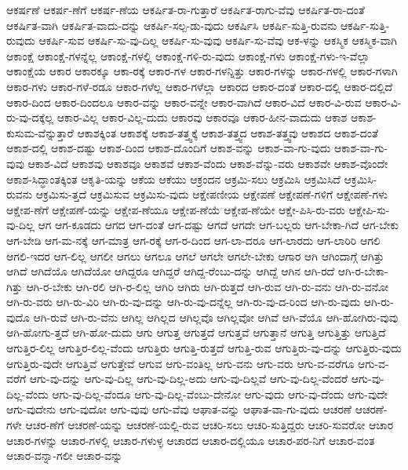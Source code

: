 {ಆಕರ್ಷಣೆ
ಆಕರ್ಷ-ಣೆಗೆ
ಆಕರ್ಷ-ಣೆಯ
ಆಕರ್ಷಿತ-ರಾ-ಗುತ್ತಾರೆ
ಆಕರ್ಷಿತ-ರಾಗು-ವೆವು
ಆಕರ್ಷಿತ-ರಾ-ದಂತೆ
ಆಕರ್ಷಿತ-ವಾಗಿ
ಆಕರ್ಷಿತ-ವಾದು-ದನ್ನು
ಆಕರ್ಷಿ-ಸಲ್ಪ-ಡು-ವುದು
ಆಕರ್ಷಿಸಿ
ಆಕರ್ಷಿ-ಸುತ್ತಿ-ರುವನು
ಆಕರ್ಷಿ-ಸುತ್ತಿ-ರುವುದು
ಆಕರ್ಷಿ-ಸುವ
ಆಕರ್ಷಿ-ಸು-ವು-ದಿಲ್ಲ
ಆಕರ್ಷಿ-ಸು-ವುವು
ಆಕರ್ಷಿ-ಸು-ವೆವು
ಆಕ-ಳನ್ನು
ಆಕಸ್ಮಿಕ
ಆಕಸ್ಮಿಕ-ವಾಗಿ
ಆಕಾಂಕ್ಷೆ
ಆಕಾಂಕ್ಷೆ-ಗಳನ್ನೆಲ್ಲ
ಆಕಾಂಕ್ಷೆ-ಗಳಲ್ಲಿ
ಆಕಾಂಕ್ಷೆ-ಗಳಿ-ರು-ವುದು
ಆಕಾಂಕ್ಷೆ-ಗಳು
ಆಕಾಂಕ್ಷೆ-ಗಳು-ಇ-ವೆಲ್ಲಾ
ಆಕಾಂಕ್ಷೆಯ
ಆಕಾರ
ಆಕಾರಕ್ಕೂ
ಆಕಾ-ರಕ್ಕೆ
ಆಕಾರ-ಗಳ
ಆಕಾರ-ಗಳನ್ನಿತ್ತು
ಆಕಾರ-ಗಳನ್ನು
ಆಕಾರ-ಗಳಲ್ಲಿ
ಆಕಾರ-ಗಳಾಗಿ
ಆಕಾರ-ಗಳು
ಆಕಾರ-ಗಳೆ-ರಡೂ
ಆಕಾರ-ಗಳೆಲ್ಲ
ಆಕಾರ-ಗಳೆಲ್ಲಾ
ಆಕಾರದ
ಆಕಾರ-ದಂತೆ
ಆಕಾರ-ದಲ್ಲಿ
ಆಕಾರ-ದಲ್ಲಿದೆ
ಆಕಾರ-ದಿಂದ
ಆಕಾರ-ದಿಂದಲೂ
ಆಕಾರ-ವನ್ನು
ಆಕಾರ-ವನ್ನೇ
ಆಕಾರ-ವಾಗಿದೆ
ಆಕಾರ-ವಿದೆ
ಆಕಾರ-ವಿ-ರುವ
ಆಕಾರ-ವಿ-ರು-ವು-ದಕ್ಕೆಲ್ಲ
ಆಕಾರ-ವಿಲ್ಲ
ಆಕಾರ-ವಿಲ್ಲ-ದುದು
ಆಕಾರವು
ಆಕಾರವೂ
ಆಕಾರ-ಹೀನ-ವಾದುದು
ಆಕಾಶ
ಆಕಾಶ-ಕುಸುಮ-ವೆನ್ನುತ್ತಾರೆ
ಆಕಾಶಕ್ಕಿಂತ
ಆಕಾಶಕ್ಕೆ
ಆಕಾಶ-ತತ್ತ್ವಕ್ಕೆ
ಆಕಾಶ-ತತ್ತ್ವದ
ಆಕಾಶ-ತತ್ತ್ವವು
ಆಕಾಶದ
ಆಕಾಶ-ದಂತೆ
ಆಕಾಶ-ದಲ್ಲಿ
ಆಕಾಶ-ದಷ್ಟು
ಆಕಾಶ-ದಿಂದ
ಆಕಾಶ-ದೊಂದಿಗೆ
ಆಕಾಶ-ವನ್ನು
ಆಕಾಶ-ವಾ-ಗು-ವುದು
ಆಕಾಶ-ವಾ-ಗು-ವುವು
ಆಕಾಶ-ವಿದೆ
ಆಕಾಶವು
ಆಕಾಶವೂ
ಆಕಾಶವೆ
ಆಕಾಶ-ವೆಂದು
ಆಕಾಶ-ವೆನ್ನು-ವರು
ಆಕಾಶವೇ
ಆಕಾಶ-ವೊಂದೇ
ಆಕಾಶ-ಸಿದ್ಧಾಂತಕ್ಕಿಂತ
ಆಕೃತಿ-ಯನ್ನು
ಆಕೆಯ
ಆಕೆಯು
ಆಕ್ರಂದನ
ಆಕ್ರಮಿ-ಸಲು
ಆಕ್ರಮಿಸಿ
ಆಕ್ರಮಿಸಿದೆ
ಆಕ್ರಮಿಸಿ-ರುವನು
ಆಕ್ರಮಿಸು-ತ್ತದೆ
ಆಕ್ರಮಿಸುವ
ಆಕ್ರಮಿಸು-ವುದು
ಆಕ್ಷೇಪಣೀಯ
ಆಕ್ಷೇಪಣೆ
ಆಕ್ಷೇಪಣೆ-ಗಳಿಗೆ
ಆಕ್ಷೇಪಣೆ-ಗಳು
ಆಕ್ಷೇಪ-ಣೆಗೆ
ಆಕ್ಷೇಪಣೆ-ಯನ್ನು
ಆಕ್ಷೇಪ-ಣೆಯೂ
ಆಕ್ಷೇಪ-ಣೆಯೆ
ಆಕ್ಷೇಪ-ಣೆಯೇ
ಆಕ್ಷೇ-ಪಿಸಿ-ರು-ವರು
ಆಕ್ಷೇಪಿ-ಸು-ವು-ದಿಲ್ಲ
ಆಗ
ಆಗ-ಕೂಡದು
ಆಗದ
ಆಗ-ದಂತೆ
ಆಗ-ದಷ್ಟು
ಆಗದೆ
ಆಗದೇ
ಆಗ-ಬಲ್ಲರು
ಆಗ-ಬೇಕಾ-ಗಿದೆ
ಆಗ-ಬೇಕು
ಆಗ-ಬೇಡಿ
ಆಗ-ಮ-ನಕ್ಕೆ
ಆಗ-ಮಾತ್ರ
ಆಗ-ರಕ್ಕೆ
ಆಗ-ರ-ದಿಂದ
ಆಗ-ಲಾ-ದರೂ
ಆಗ-ಲಾರದು
ಆಗ-ಲಾರಿರಿ
ಆಗಲಿ
ಆಗಲಿ-ಇದರ
ಆಗ-ಲಿಲ್ಲ
ಆಗಲೀ
ಆಗಲು
ಆಗಲೂ
ಆಗಲೆ
ಆಗಲೇ
ಆಗಲೇ-ಬೇಕು
ಆಗಾರ
ಆಗಿ
ಆಗಿಂದಾಗ್ಗೆ
ಆಗಿತ್ತು
ಆಗಿದೆ
ಆಗಿದೆಯೊ
ಆಗಿದೆಯೋ
ಆಗಿದ್ದರೂ
ಆಗಿದ್ದರೆ
ಆಗಿದ್ದ-ರೆಂಬು-ದನ್ನು
ಆಗಿದ್ದೆ
ಆಗಿನ
ಆಗಿ-ರದೆ
ಆಗಿ-ರ-ಬೇಕಾ-ಗಿತ್ತು
ಆಗಿ-ರ-ಬೇಕು
ಆಗಿ-ರಲಿ
ಆಗಿ-ರ-ಲಿಲ್ಲ
ಆಗಿರಿ
ಆಗಿರು
ಆಗಿ-ರುತ್ತದೆ
ಆಗಿ-ರುವ
ಆಗಿ-ರು-ವನು
ಆಗಿ-ರು-ವನೋ
ಆಗಿ-ರು-ವರು
ಆಗಿ-ರು-ವಿರಿ
ಆಗಿ-ರು-ವು-ದನ್ನು
ಆಗಿ-ರು-ವು-ದನ್ನೆಲ್ಲ
ಆಗಿ-ರು-ವು-ದ-ರಿಂದ
ಆಗಿ-ರು-ವುದು
ಆಗಿ-ರು-ವುದೊ
ಆಗಿ-ರುವೆ
ಆಗಿ-ರು-ವೆನು
ಆಗಿಲ್ಲ
ಆಗಿಲ್ಲದ
ಆಗಿಲ್ಲವೊ
ಆಗಿಲ್ಲವೋ
ಆಗಿವೆ
ಆಗಿ-ವೆಯೊ
ಆಗಿ-ಹೋಗಿರು-ವುವು
ಆಗಿ-ಹೋಗು-ತ್ತದೆ
ಆಗಿ-ಹೋ-ದುದು
ಆಗು
ಆಗುತ್ತ
ಆಗುತ್ತದೆ
ಆಗುತ್ತವೆ
ಆಗುತ್ತಾನೆ
ಆಗುತ್ತಿ
ಆಗುತ್ತಿತ್ತು
ಆಗುತ್ತಿದೆ
ಆಗುತ್ತಿರ-ಲಿಲ್ಲ
ಆಗುತ್ತಿರ-ಲಿಲ್ಲ-ವೆಂದು
ಆಗುತ್ತಿರು
ಆಗುತ್ತಿ-ರುತ್ತದೆ
ಆಗುತ್ತಿ-ರುವ
ಆಗುತ್ತಿರು-ವು-ದನ್ನು
ಆಗುತ್ತಿರು-ವುದು
ಆಗುತ್ತಿರು-ವುದೇ
ಆಗುತ್ತಿವೆ
ಆಗುತ್ತೇವೆ
ಆಗುವ
ಆಗು-ವಂತಿಲ್ಲ
ಆಗು-ವನು
ಆಗು-ವರು
ಆಗು-ವ-ವರೆಗೂ
ಆಗು-ವ-ವರೆಗೆ
ಆಗು-ವು-ದನ್ನು
ಆಗು-ವು-ದಿಲ್ಲ
ಆಗು-ವು-ದಿಲ್ಲ-ಅದು
ಆಗು-ವು-ದಿಲ್ಲವೆ
ಆಗು-ವು-ದಿಲ್ಲ-ವೆಂದರೆ
ಆಗು-ವು-ದಿಲ್ಲ-ವೆಂದು
ಆಗು-ವು-ದಿಲ್ಲ-ವೆಂದೂ
ಆಗು-ವು-ದಿಲ್ಲ-ವೆಂಬು-ದೇನೋ
ಆಗು-ವುದು
ಆಗು-ವು-ದೆಂದು
ಆಗು-ವುದೇ
ಆಗು-ವುದೇನು
ಆಗು-ವುದೋ
ಆಗು-ವುವು
ಆಗು-ವೆವು
ಆಘಾತ-ವನ್ನು
ಆಘಾತ-ವಾ-ಗು-ವುದು
ಆಚರಣೆ
ಆಚರಣೆ-ಗಳೇ
ಆಚರ-ಣೆಗೆ
ಆಚರಣೆ-ಯನ್ನು
ಆಚರಣೆ-ಯಲ್ಲಿ-ರುವ
ಆಚರಿ-ಸಲು
ಆಚರಿ-ಸುತ್ತಿದ್ದರು
ಆಚರಿ-ಸುವರೋ
ಆಚಾರ
ಆಚಾರ-ಗಳನ್ನು
ಆಚಾರ-ಗಳಲ್ಲಿ
ಆಚಾರ-ಗಳುಳ್ಳ
ಆಚಾರದ
ಆಚಾರ-ದಲ್ಲಿಯೂ
ಆಚಾರ-ಪರ-ನಿಗೆ
ಆಚಾರ-ವಂತ
ಆಚಾರ-ವನ್ನಾ-ಗಲೀ
ಆಚಾರ-ವನ್ನು
}
